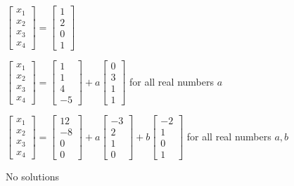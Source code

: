 \documentclass{article}
\begin{document}
\begin{readinessAssuranceTest}
  \begin{multicols}{2}
  \begin{readinessAssuranceTestChoices}
  \item \(
          \begin{bmatrix}
            x_1 \\ x_2 \\ x_3 \\ x_4
          \end{bmatrix}=
          \begin{bmatrix}
            1 \\ 2 \\ 0 \\ 1
          \end{bmatrix}
        \)
  \item \(
          \begin{bmatrix}
            x_1 \\ x_2 \\ x_3 \\ x_4
          \end{bmatrix}=
          \begin{bmatrix}
            1 \\ 1 \\ 4 \\ -5
          \end{bmatrix}+a
          \begin{bmatrix}
            0 \\ 3 \\ 1 \\ 1
          \end{bmatrix}
        \) for all real numbers \(a\)
  \item \(
          \begin{bmatrix}
            x_1 \\ x_2 \\ x_3 \\ x_4
          \end{bmatrix}=
          \begin{bmatrix}
            12 \\ -8 \\ 0 \\ 0
          \end{bmatrix}+a
          \begin{bmatrix}
            -3 \\ 2 \\ 1 \\ 0
          \end{bmatrix}+b
          \begin{bmatrix}
            -2 \\ 1 \\ 0 \\ 1
          \end{bmatrix}
        \) for all real numbers \(a,b\) %
  \item No solutions
  \end{readinessAssuranceTestChoices}
  \end{multicols}


\end{readinessAssuranceTest}
\end{document}
